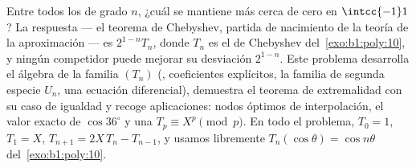 \begin{problem}\label{pb:b1:poly:1}
Entre todos los  \emph{} de grado $n$, ¿cuál se
mantiene más cerca de cero en $\intcc{-1}1$? La respuesta --- el
teorema de Chebyshev, partida de nacimiento de la teoría de la
aproximación --- es $2^{1-n}T_n$, donde $T_n$ es el  de
Chebyshev del~\cref{exo:b1:poly:10}, y ningún competidor  puede
mejorar su desviación $2^{1-n}$. Este
problema desarrolla el álgebra de la familia $(T_n)$ (, coeficientes explícitos, la familia de segunda especie
$U_n$, una ecuación diferencial), demuestra el teorema de extremalidad
con su caso de igualdad y recoge aplicaciones: nodos óptimos de
interpolación, el valor exacto de $\cos 36^\circ$ y una 
$T_p \equiv X^p \pmod p$. En todo el problema, $T_0 = 1$, $T_1 = X$,
$T_{n+1} = 2X\,T_n - T_{n-1}$, y usamos libremente
$T_n(\cos\theta) = \cos n\theta$ del~\cref{exo:b1:poly:10}.


\end{problem}
